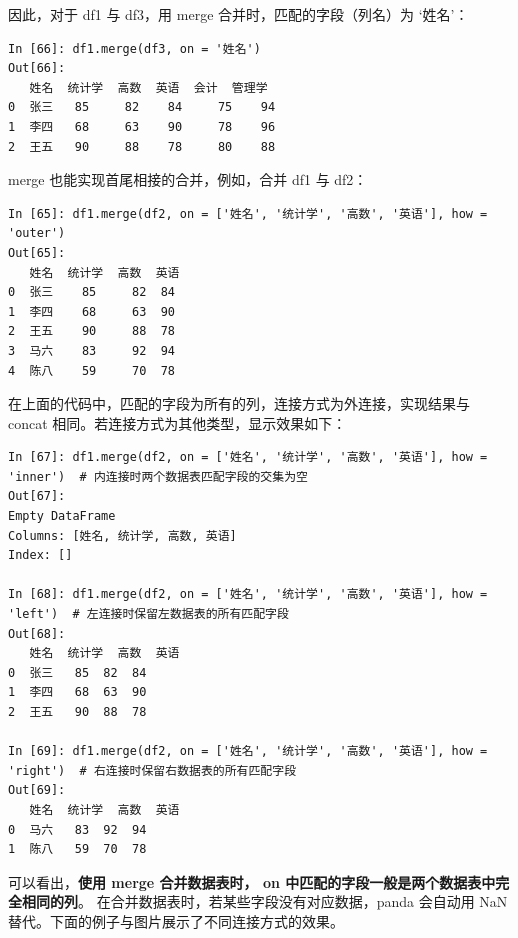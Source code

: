 因此，对于 df1 与 df3，用 merge 合并时，匹配的字段（列名）为 `姓名'：

\begin{lstlisting}[Language=Python]
In [66]: df1.merge(df3, on = '姓名')
Out[66]:
   姓名  统计学  高数  英语  会计  管理学
0  张三   85     82    84     75    94
1  李四   68     63    90     78    96
2  王五   90     88    78     80    88
\end{lstlisting}

merge 也能实现首尾相接的合并，例如，合并 df1 与 df2：

\begin{lstlisting}[Language=Python]
In [65]: df1.merge(df2, on = ['姓名', '统计学', '高数', '英语'], how = 'outer')
Out[65]:
   姓名  统计学  高数  英语
0  张三    85     82  84
1  李四    68     63  90
2  王五    90     88  78
3  马六    83     92  94
4  陈八    59     70  78
\end{lstlisting}

在上面的代码中，匹配的字段为所有的列，连接方式为外连接，实现结果与 concat 相同。若连接方式为其他类型，显示效果如下：

\begin{lstlisting}[Language=Python]
In [67]: df1.merge(df2, on = ['姓名', '统计学', '高数', '英语'], how = 'inner')  # 内连接时两个数据表匹配字段的交集为空
Out[67]:
Empty DataFrame
Columns: [姓名, 统计学, 高数, 英语]
Index: []

In [68]: df1.merge(df2, on = ['姓名', '统计学', '高数', '英语'], how = 'left')  # 左连接时保留左数据表的所有匹配字段
Out[68]:
   姓名  统计学  高数  英语
0  张三   85  82  84
1  李四   68  63  90
2  王五   90  88  78

In [69]: df1.merge(df2, on = ['姓名', '统计学', '高数', '英语'], how = 'right')  # 右连接时保留右数据表的所有匹配字段
Out[69]:
   姓名  统计学  高数  英语
0  马六   83  92  94
1  陈八   59  70  78
\end{lstlisting}

可以看出，\textbf{使用 merge 合并数据表时， on 中匹配的字段一般是两个数据表中完全相同的列}。 在合并数据表时，若某些字段没有对应数据，panda 会自动用 NaN 替代。下面的例子与图片展示了不同连接方式的效果。

